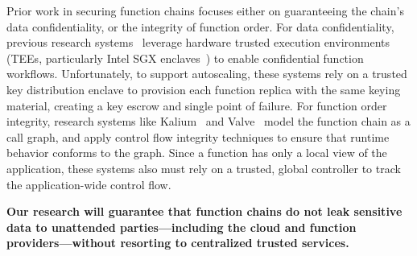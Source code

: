 %
Prior work in securing function chains focuses either on guaranteeing the
chain's data confidentiality, or the integrity of function order.
%
For data confidentiality, previous research systems~\cite{16-osdi-ryoan,
    19-ccsw-s_faas,
    19-systor-clemmys,
    19-systor-trust_more_serverless,
    21-isca-confidential_serverless,
    23-sec-confidential_serverless,
    23-socc-cryonics}
leverage hardware trusted execution environments
(TEEs, particularly Intel SGX enclaves~\cite{
    13-hasp-innovative_instructions,
    16-techreport-intel_sgx_explained})
to enable confidential function workflows.
%
Unfortunately, to support autoscaling, these systems rely on a trusted
key distribution enclave to provision each function replica with the same
keying material, creating a key escrow and single point of failure.
%
For function order integrity, research systems like Kalium~\cite{23-sec-kalium}
and Valve~\cite{20-www-valve} model the function chain as a call graph, and
apply control flow integrity techniques to ensure that runtime behavior
conforms to the graph.
%
Since a function has only a local view of the application, these systems also
must rely on a trusted, global controller to track the application-wide control
flow.


%

\begin{tcolorbox}[boxsep=1pt]
\textbf{
    Our research will guarantee that function chains do not leak sensitive data
    to unattended parties---including the cloud and function
    providers---without resorting to centralized trusted services.
}
\end{tcolorbox}

